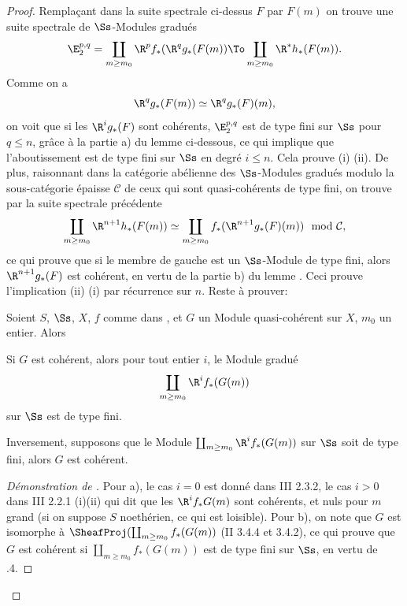 \begin{proof}
Rempla\c cant dans la suite spectrale ci-dessus $F$ par $F(m)$ on
trouve une suite spectrale de $\Ss$-Modules gradu\'es\pageoriginale
\[
\E_2^{p, q}= \coprod_{m\geq m_0} \R^pf_\ast(\R^qg_\ast(F(m)) \To \coprod_{m\geq m_0} \R^\ast h_\ast(F(m)).
\]
Comme on a
\[
\R^qg_\ast(F(m)) \simeq \R^qg_\ast(F) (m),
\]
on voit que si les $\R^ig_\ast(F)$ sont coh\'erents, $\E_2^{p, q}$ est de type fini sur $\Ss$ pour $q\leq n$, gr\^ace \`a la partie a) du lemme  ci-dessous, ce qui implique que l'aboutissement est de type fini sur $\Ss$ en degr\'e $i\leq n$. Cela prouve (i) \ALORS (ii). De plus, raisonnant dans la cat\'egorie ab\'elienne des $\Ss$-Modules gradu\'es modulo la sous-cat\'egorie \'epaisse $\mathcal{C}$ de ceux qui sont quasi-coh\'erents de type fini, on trouve par la suite spectrale pr\'ec\'edente
\[
\coprod_{m\geq m_0} \R^{n+1} h_\ast(F(m)) \simeq \coprod_{m\geq m_0} f_\ast (\R^{n+1} g_\ast(F)(m)) \mod \mathcal{C},
\]
ce qui prouve que si le membre de gauche est un $\Ss$-Module de type fini, alors $\R^{n+1} g_\ast(F)$ est coh\'erent, en vertu de la partie b) du lemme . Ceci prouve l'implication (ii) \ALORS (i) par r\'ecurrence sur $n$. Reste \`a prouver:

\begin{lemme} \label{XII.5.3} Soient $S$, $\Ss$, $X$, $f$ comme dans , et $G$ un Module quasi-coh\'erent sur $X$, $m_0$ un entier. Alors
\begin{enumeratea}
\item
Si $G$ est coh\'erent, alors pour tout entier $i$, le Module gradu\'e
\[
\coprod_{m\geq m_0} \R^i f_\ast(G(m))
\]
sur $\Ss$ est de type fini.
\item
Inversement, supposons que le Module $\coprod_{m\geq m_0} \R^i f_\ast(G(m))$ sur $\Ss$ soit de type fini, alors $G$ est coh\'erent.
\end{enumeratea}
\end{lemme}

\begin{proof}[D\'emonstration de ]
Pour a), le cas $i=0$ est donn\'e dans \EGA III 2.3.2, le cas $i>0$ dans \EGA III 2.2.1 (i)(ii) qui dit que les $ \R^i f_\ast G(m)$ sont coh\'erents\pageoriginale, et nuls pour $m$ grand (si on suppose $S$ noeth\'erien, ce qui est loisible). Pour b), on note que $G$ est isomorphe \`a $\SheafProj (\coprod_{m\geq m_0}f_\ast(G(m))$ (\EGA II 3.4.4 et 3.4.2), ce qui prouve que $G$ est coh\'erent si $\coprod_{m\geq m_0}f_\ast(G(m))$ est de type fini sur $\Ss$, en vertu de .4.
\skipqed
\end{proof}
\skipqed
\end{proof}

